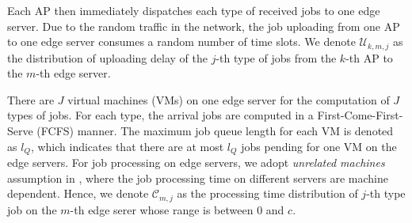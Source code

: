 Each AP then immediately dispatches each type of received jobs to one edge server.
Due to the random traffic in the network, the job uploading from one AP to one edge server consumes a random number of time slots.
We denote $\mathcal{U}_{k,m,j}$ as the distribution of uploading delay of the $j$-th type of jobs from the $k$-th AP to the $m$-th edge server.

There are $J$ virtual machines (VMs) on one edge server for the computation of $J$ types of jobs.
For each type, the arrival jobs are computed in a First-Come-First-Serve (FCFS) manner.
The maximum job queue length for each VM is denoted as $l_Q$, which indicates that there are at most $l_Q$ jobs pending for one VM on the edge servers. 
For job processing on edge servers, we adopt \emph{unrelated machines} assumption in \cite{tan-online}, where the job processing time on different servers are machine dependent. %
Hence, we denote $\mathcal{C}_{m,j}$ as the processing time distribution  of $j$-th type job on the $m$-th edge serer whose range is between $0$ and $c$.

